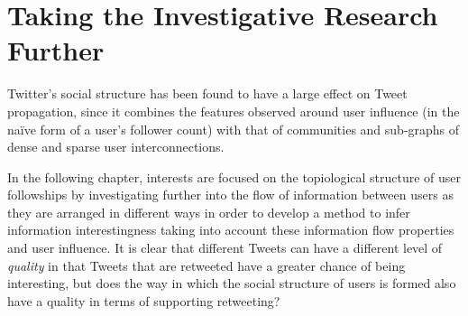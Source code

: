 \section{Taking the Investigative Research Further}
Twitter's social structure has been found to have a large effect on Tweet propagation, since it combines the features observed around user influence (in the na{\"i}ve form of a user's follower count) with that of communities and sub-graphs of dense and sparse user interconnections.

In the following chapter, interests are focused on the topiological structure of user followships by investigating further into the flow of information between users as they are arranged in different ways in order to develop a method to infer information interestingness taking into account these information flow properties and user influence. It is clear that different Tweets can have a different level of \textit{quality} in that Tweets that are retweeted have a greater chance of being interesting, but does the way in which the social structure of users is formed also have a quality in terms of supporting retweeting?


